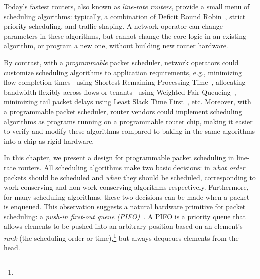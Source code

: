 
Today's fastest routers, also known as \textit{line-rate routers},
provide a small menu of scheduling algorithms: typically, a
combination of Deficit Round Robin~\cite{drr}, strict priority
scheduling, and traffic shaping. A network operator can change
parameters in these algorithms, but cannot change the core logic in an
existing algorithm, or program a new one, without building new router
hardware.

By contrast, with a {\em programmable} packet scheduler, network
operators could customize scheduling algorithms to application
requirements, e.g., minimizing flow completion times~\cite{pFabric}
using Shortest Remaining Processing Time~\cite{srpt}, allocating
bandwidth flexibly across flows or tenants~\cite{eyeq, faircloud}
using Weighted Fair Queueing~\cite{wfq}, minimizing tail packet delays
using Least Slack Time First~\cite{lstf}, etc. Moreover, with a
programmable packet scheduler, router vendors could implement
scheduling algorithms as programs running on a programmable router
chip, making it easier to verify and modify these algorithms compared to
baking in the same algorithms into a chip as rigid hardware.

In this chapter, we present a design for programmable packet scheduling in
line-rate routers. All scheduling algorithms make two basic
decisions: in {\em what order} packets should be scheduled and {\em
  when} they should be scheduled, corresponding to work-conserving
and non-work-conserving algorithms respectively.  Furthermore, for many scheduling
algorithms, these two decisions can be made when a packet is
enqueued. 
This observation suggests a natural hardware primitive for packet
scheduling: a {\em push-in first-out queue
  (PIFO)}~\cite{pifo}. A PIFO is a priority queue that
allows elements to be pushed into an arbitrary position based on an
element's {\em rank} (the scheduling order or time),\footnote{} but always dequeues elements from the head.


